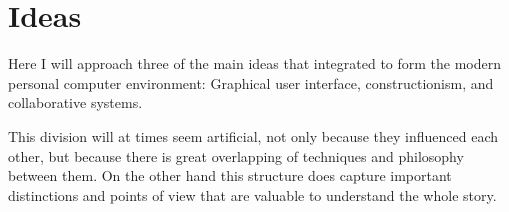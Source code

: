\section{Ideas}

Here I will approach three of the main ideas that integrated to
form the modern personal computer environment: Graphical user
interface, constructionism, and collaborative systems. 

This division will at times seem artificial, not only because they
influenced each other, but because there is great overlapping of
techniques and philosophy between them. On the other hand this
structure does capture important distinctions and points of view that
are valuable to understand the whole story.



